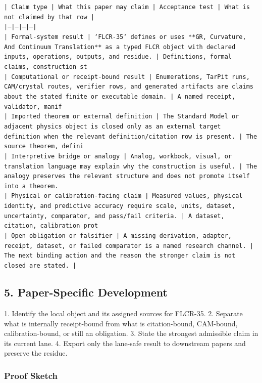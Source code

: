 \documentclass[11pt]{article}
\begin{document}
\noindent\texttt{| Claim type | What this paper may claim | Acceptance test | What is not claimed by that row |}\\
\noindent\texttt{|---|---|---|---|}\\
\noindent\texttt{| Formal-system result | `FLCR-35` defines or uses **GR, Curvature, And Continuum Translation** as a typed FLCR object with declared inputs, operations, outputs, and residue. | Definitions, formal claims, construction st}\\
\noindent\texttt{| Computational or receipt-bound result | Enumerations, TarPit runs, CAM/crystal routes, verifier rows, and generated artifacts are claims about the stated finite or executable domain. | A named receipt, validator, manif}\\
\noindent\texttt{| Imported theorem or external definition | The Standard Model or adjacent physics object is closed only as an external target definition when the relevant definition/citation row is present. | The source theorem, defini}\\
\noindent\texttt{| Interpretive bridge or analogy | Analog, workbook, visual, or translation language may explain why the construction is useful. | The analogy preserves the relevant structure and does not promote itself into a theorem. }\\
\noindent\texttt{| Physical or calibration-facing claim | Measured values, physical identity, and predictive accuracy require scale, units, dataset, uncertainty, comparator, and pass/fail criteria. | A dataset, citation, calibration prot}\\
\noindent\texttt{| Open obligation or falsifier | A missing derivation, adapter, receipt, dataset, or failed comparator is a named research channel. | The next binding action and the reason the stronger claim is not closed are stated. | }\\

\subsection*{5. Paper-Specific Development}

1. Identify the local object and its assigned sources for FLCR-35.
2. Separate what is internally receipt-bound from what is citation-bound, CAM-bound, calibration-bound, or still an obligation.
3. State the strongest admissible claim in its current lane.
4. Export only the lane-safe result to downstream papers and preserve the residue.

\subsubsection*{Proof Sketch}
\end{document}
